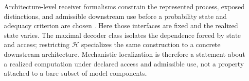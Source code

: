 Architecture-level receiver formalisms constrain the represented process, exposed distinctions, and admissible downstream use before a probability state and adequacy criterion are chosen \citep{rosariofreytes2026architecture}. Here those interfaces are fixed and the realized state varies. The maximal decoder class isolates the dependence forced by state and access; restricting $\mathscr H$ specializes the same construction to a concrete downstream architecture. Mechanistic localization is therefore a statement about a realized computation under declared access and admissible use, not a property attached to a bare subset of model components.

\label{sec:main-text-end}
